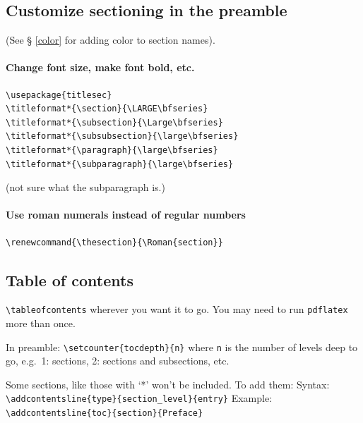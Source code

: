 \documentclass{article}
\begin{document}
\subsection{Customize sectioning in the preamble}
(See \S{} \ref{color} for adding color to section names).
\paragraph{Change font size, make font bold, etc.}
\begin{verbatim}
\usepackage{titlesec}
\titleformat*{\section}{\LARGE\bfseries}
\titleformat*{\subsection}{\Large\bfseries}
\titleformat*{\subsubsection}{\large\bfseries}
\titleformat*{\paragraph}{\large\bfseries}
\titleformat*{\subparagraph}{\large\bfseries}
\end{verbatim}
(not sure what the subparagraph is.)
\paragraph{Use roman numerals instead of regular numbers}
\begin{verbatim}
\renewcommand{\thesection}{\Roman{section}}
\end{verbatim}
\subsection{Table of contents}

\verb|\tableofcontents| wherever you want it to go. You may need to
run {\tt pdflatex} more than once.

In preamble:
\verb|\setcounter{tocdepth}{n}| where \verb|n| is the number of levels deep
to go, e.g.\ 1: sections, 2: sections and subsections, etc.

Some sections, like those with `*' won't be included. To add them:
Syntax: \verb|\addcontentsline{type}{section_level}{entry}|
Example: \verb|\addcontentsline{toc}{section}{Preface}|
\end{document}

